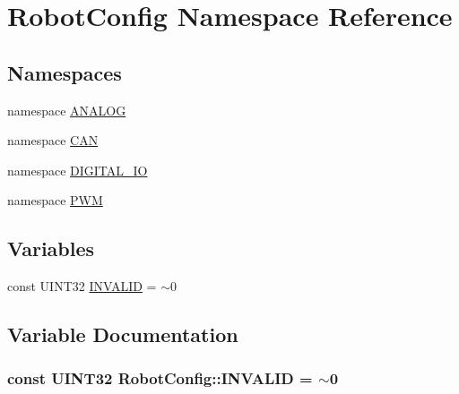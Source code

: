 \hypertarget{namespace_robot_config}{
\section{\-Robot\-Config \-Namespace \-Reference}
\label{namespace_robot_config}
}
\subsection*{\-Namespaces}
\begin{DoxyCompactItemize}
\item 
namespace \hyperlink{namespace_robot_config_1_1_a_n_a_l_o_g}{\-A\-N\-A\-L\-O\-G}
\item 
namespace \hyperlink{namespace_robot_config_1_1_c_a_n}{\-C\-A\-N}
\item 
namespace \hyperlink{namespace_robot_config_1_1_d_i_g_i_t_a_l___i_o}{\-D\-I\-G\-I\-T\-A\-L\-\_\-\-I\-O}
\item 
namespace \hyperlink{namespace_robot_config_1_1_p_w_m}{\-P\-W\-M}
\end{DoxyCompactItemize}
\subsection*{\-Variables}
\begin{DoxyCompactItemize}
\item 
const \-U\-I\-N\-T32 \hyperlink{namespace_robot_config_a535035734aeb0aa089cd83f2282630d6}{\-I\-N\-V\-A\-L\-I\-D} = $\sim$0
\end{DoxyCompactItemize}


\subsection{\-Variable \-Documentation}
\hypertarget{namespace_robot_config_a535035734aeb0aa089cd83f2282630d6}{
\subsubsection[{\-I\-N\-V\-A\-L\-I\-D}]{\setlength{\rightskip}{0pt plus 5cm}const \-U\-I\-N\-T32 {\bf \-Robot\-Config\-::\-I\-N\-V\-A\-L\-I\-D} = $\sim$0}}
\label{namespace_robot_config_a535035734aeb0aa089cd83f2282630d6}
